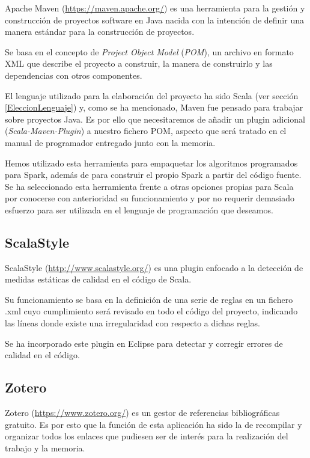 Apache Maven (\url{https://maven.apache.org/}) es una herramienta para la gestión y construcción de proyectos software en Java nacida con la intención de definir una manera estándar para la construcción de proyectos.

Se basa en el concepto de \textit{Project Object Model} (\textit{POM}), un archivo en formato XML que describe el proyecto a construir, la manera de construirlo y  las dependencias con otros componentes.

El lenguaje utilizado para la elaboración del proyecto ha sido Scala (ver sección \ref{EleccionLenguaje}) y, como se ha mencionado, Maven fue pensado para trabajar sobre proyectos Java. Es por ello que necesitaremos de añadir un plugin adicional (\textit{Scala-Maven-Plugin}) a nuestro fichero POM, aspecto que será tratado en el manual de programador entregado junto con la memoria.

Hemos utilizado esta herramienta para empaquetar los algoritmos programados para Spark, además de para construir el propio Spark a partir del código fuente. Se ha seleccionado esta herramienta frente a otras opciones propias para Scala por conocerse con anterioridad su funcionamiento y por no requerir demasiado esfuerzo para ser utilizada en el lenguaje de programación que deseamos.

\subsection{ScalaStyle}

ScalaStyle (\url{http://www.scalastyle.org/}) es una plugin enfocado a la detección de medidas estáticas de calidad en el código de Scala.

Su funcionamiento se basa en la definición de una serie de reglas en un fichero .xml cuyo cumplimiento será revisado en todo el código del proyecto, indicando las líneas donde existe una irregularidad con respecto a dichas reglas.

Se ha incorporado este plugin en Eclipse para detectar y corregir errores de calidad en el código.


\subsection{Zotero}
Zotero (\url{https://www.zotero.org/}) es un gestor de referencias bibliográficas gratuito. Es por esto que la función de esta aplicación ha sido la de recompilar y organizar todos los enlaces que pudiesen ser de interés para la realización del trabajo y la memoria.

